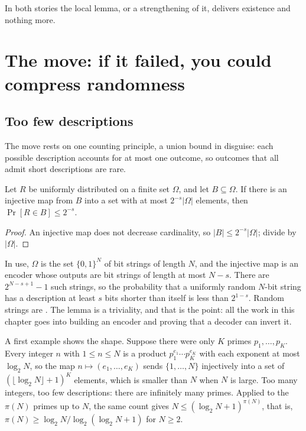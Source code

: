 \begin{refsection}
In both stories the local lemma, or a strengthening of it, delivers existence and nothing more.

\section{The move: if it failed, you could compress randomness}\label{sec:compression:move}

\subsection{Too few descriptions}\label{sec:compression:descriptions}

The move rests on one counting principle, a union bound in disguise: each possible description accounts for at most one outcome, so outcomes that all admit short descriptions are rare.

\begin{lemma}\label{lem:compression:encoding}
Let $R$ be uniformly distributed on a finite set $\Omega$, and let $B\subseteq\Omega$. If there is an injective map from $B$ into a set with at most $2^{-s}|\Omega|$ elements, then $\Pr[R\in B]\le2^{-s}$.
\end{lemma}

\begin{proof}
An injective map does not decrease cardinality, so $|B|\le2^{-s}|\Omega|$; divide by $|\Omega|$.
\end{proof}

In use, $\Omega$ is the set $\{0,1\}^N$ of bit strings of length $N$, and the injective map is an encoder whose outputs are bit strings of length at most $N-s$. There are $2^{N-s+1}-1$ such strings, so the probability that a uniformly random $N$-bit string has a description at least $s$ bits shorter than itself is less than $2^{1-s}$. Random strings are . The lemma is a triviality, and that is the point: all the work in this chapter goes into building an encoder and proving that a decoder can invert it.

A first example shows the shape. Suppose there were only $K$ primes $p_1,\dots,p_K$. Every integer $n$ with $1\le n\le N$ is a product $p_1^{e_1}\cdots p_K^{e_K}$ with each exponent at most $\log_2N$, so the map $n\mapsto(e_1,\dots,e_K)$ sends $\{1,\dots,N\}$ injectively into a set of $(\lfloor\log_2N\rfloor+1)^K$ elements, which is smaller than $N$ when $N$ is large. Too many integers, too few descriptions: there are infinitely many primes. Applied to the $\pi(N)$ primes up to $N$, the same count gives $N\le(\log_2N+1)^{\pi(N)}$, that is, $\pi(N)\ge\log_2N/\log_2(\log_2N+1)$ for $N\ge2$.


\end{refsection}
